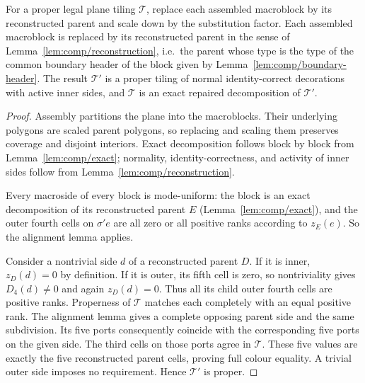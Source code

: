 \begin{lemma}
\label{lem:comp/proper}
For a proper legal plane tiling $\mathcal T$, replace each assembled
macroblock by its reconstructed parent and scale down by the substitution
factor. Each assembled macroblock is replaced by its reconstructed parent in
the sense of Lemma~\ref{lem:comp/reconstruction}, i.e.\ the parent whose
type is the type of the common boundary header of the block given by
Lemma~\ref{lem:comp/boundary-header}. The result $\mathcal T'$ is a proper tiling of normal identity-correct decorations
with active inner sides, and $\mathcal T$ is an exact repaired decomposition
of $\mathcal T'$.
\end{lemma}
\begin{proof}
Assembly partitions the plane into the macroblocks. Their underlying
polygons are scaled parent polygons, so replacing and scaling them preserves
coverage and disjoint interiors. Exact decomposition follows block by block
from Lemma~\ref{lem:comp/exact}; normality, identity-correctness, and activity of inner sides follow
from Lemma~\ref{lem:comp/reconstruction}.

Every macroside of every block is mode-uniform: the block is an exact
decomposition of its reconstructed parent $E$ (Lemma~\ref{lem:comp/exact}),
and the outer fourth cells on $\sigma'e$ are all zero or all positive
ranks according to $z_E(e)$. So the alignment lemma applies.

Consider a nontrivial side $d$ of a reconstructed parent $D$. If it is
inner, $z_D(d)=0$ by definition. If it is outer, its fifth cell is zero,
so nontriviality gives $D_4(d)\ne0$ and again $z_D(d)=0$. Thus all its
child outer fourth cells are positive ranks. Properness of $\mathcal T$
matches each completely with an equal positive rank. The alignment lemma
gives a complete opposing parent side and the same subdivision. Its five
ports consequently coincide with the corresponding five ports on the
given side. The third cells on those ports agree in $\mathcal T$. These
five values are exactly the five reconstructed parent cells, proving full
colour equality. A trivial outer side imposes no requirement. Hence
$\mathcal T'$ is proper.
\end{proof}


